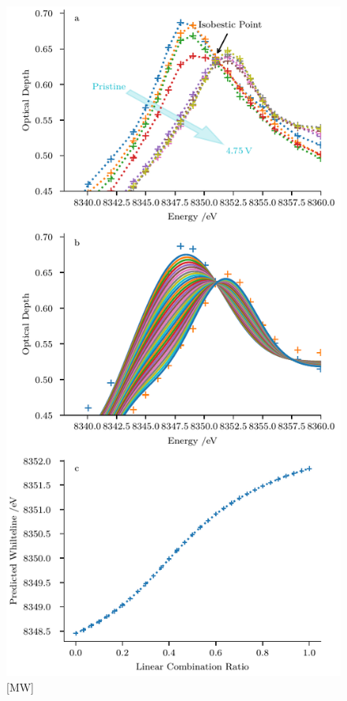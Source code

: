 \documentclass{article}
\begin{document}
\begin{figure}
  \includegraphics{figures/isobestic-point.pdf}
  \caption{[MW] }
  \label{fig:isobestic-point}
\end{figure}
\end{document}
